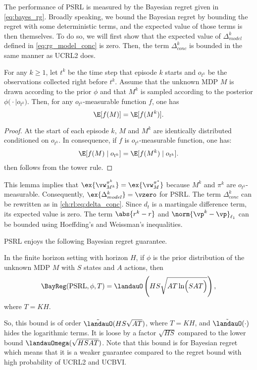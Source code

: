 The performance of PSRL is measured by the Bayesian regret given in \eqref{eq:bayes_rg}.
Broadly speaking, we bound the Bayesian regret by bounding the regret with some deterministic terms, and the expected value of those terms is then themselves.
To do so, we will first show that the expected value of $\Delta^k_{model}$ defined in \eqref{eq:rg_model_conc} is zero.
Then, the term $\Delta^k_{conc}$ is bounded in the same manner as UCRL2 does.
\begin{lem}
    \label{lem:expected_identity}
    For any $k\ge1$, let $t^k$ be the time step that episode $k$ starts and $o_{t^k}$ be the observations collected right before $t^k$.
    Assume that the unknown MDP $M$ is drawn according to the prior $\phi$ and that $M^k$ is sampled according to the posterior $\phi\bigl(\cdot\mid o_{t^k}\bigr)$. Then, for any $o_{t^k}$-measurable function $f$, one has
    \begin{equation}
        \label{eq:exp_iden}
        \E[f(M)] =\E[f(M^k)].
    \end{equation}
\end{lem}
\begin{proof}
    At the start of each episode $k$, $M$ and $M^k$ are identically distributed conditioned on $o_{t^k}$.
    In consequence, if $f$ is $o_{t^k}$-measurable function, one has:
    \begin{align*}    
        \E[f(M) \mid o_{t^k}] =\E[f(M^k) \mid o_{t^k}].
    \end{align*}
     then follows from the tower rule.
\end{proof}
This lemma implies that $\ex{\vw^{\pi^k}_{M^k}}=\ex{\vw^{\pi^*}_M}$ because $M^k$ and $\pi^k$ are $o_{t^k}$-measurable.
Consequently, $\ex{\Delta^k_{model}}=\vzero$ for PSRL.
The term $\Delta^k_{conc}$ can be rewritten as in \eqref{ch:rl:eq:delta_conc}.
Since $d_t$ is a martingale difference term, its expected value is zero.
The term $\abs{r^k-r}$ and $\norm{\vp^k-\vp}_{\ell_1}$ can be bounded using Hoeffding's and Weissman's inequalities.

PSRL enjoys the following Bayesian regret guarantee.
\begin{prop}
    \label{prop:brg_psrl}
    In the finite horizon setting with horizon $H$, if $\phi$ is the prior distribution of the unknown MDP $M$ with $S$ states and $A$ actions, then
    \begin{equation}
        \label{eq:brg_psrl}
        \BayReg(\textnormal{PSRL}, \phi, T) = \landauO\left(HS\sqrt{AT\ln\Bigl(SAT\Bigr)}\right),
    \end{equation}
    where $T=KH$.
\end{prop}
So, this bound is of order $\tilde{\landauO}(HS\sqrt{AT})$, where $T=KH$, and $\tilde{\landauO}(\cdot)$ hides the logarithmic terms.
It is loose by a factor $\sqrt{HS}$ compared to the lower bound $\landauOmega(\sqrt{HSAT})$.
Note that this bound is for Bayesian regret which means that it is a weaker guarantee compared to the regret bound with high probability of UCRL2 and UCBVI.

\endgroup
